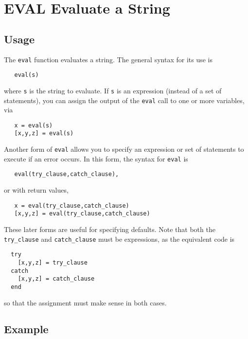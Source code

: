 \section{EVAL Evaluate a String}

\subsection{Usage}

The \verb|eval| function evaluates a string.  The general syntax
for its use is
\begin{verbatim}
   eval(s)
\end{verbatim}
where \verb|s| is the string to evaluate.  If \verb|s| is an expression
(instead of a set of statements), you can assign the output
of the \verb|eval| call to one or more variables, via
\begin{verbatim}
   x = eval(s)
   [x,y,z] = eval(s)
\end{verbatim}

Another form of \verb|eval| allows you to specify an expression or
set of statements to execute if an error occurs.  In this 
form, the syntax for \verb|eval| is
\begin{verbatim}
   eval(try_clause,catch_clause),
\end{verbatim}
or with return values,
\begin{verbatim}
   x = eval(try_clause,catch_clause)
   [x,y,z] = eval(try_clause,catch_clause)
\end{verbatim}
These later forms are useful for specifying defaults.  Note that
both the \verb|try_clause| and \verb|catch_clause| must be expressions,
as the equivalent code is
\begin{verbatim}
  try
    [x,y,z] = try_clause
  catch
    [x,y,z] = catch_clause
  end
\end{verbatim}
so that the assignment must make sense in both cases.
\subsection{Example}

